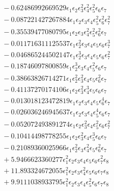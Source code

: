 \documentclass[10pt]{article}
\begin{document}
\begin{align*}
&{}  - 0.62486992669529 \epsilon_{1} \epsilon_{2} \epsilon_{3}^{2} \epsilon_{4}^{2} \epsilon_{5}^{2} \epsilon_{6} \epsilon_{7} \\
&{}  - 0.087221427267884 \epsilon_{1} \epsilon_{2} \epsilon_{3} \epsilon_{4} \epsilon_{5}^{2} \epsilon_{6}^{2} \epsilon_{7}^{2} \\
&{}  - 0.35539477080795 \epsilon_{1} \epsilon_{2} \epsilon_{3} \epsilon_{4}^{2} \epsilon_{5}^{2} \epsilon_{6}^{2} \epsilon_{7} \\
&{}  - 0.011716311125537 \epsilon_{1} \epsilon_{2}^{2} \epsilon_{3} \epsilon_{4} \epsilon_{5} \epsilon_{6} \epsilon_{7}^{3} \\
&{}  - 0.046865244502147 \epsilon_{1} \epsilon_{2}^{3} \epsilon_{3} \epsilon_{4} \epsilon_{5} \epsilon_{6} \epsilon_{7}^{2} \\
&{}  - 0.18746097800859 \epsilon_{1} \epsilon_{2}^{3} \epsilon_{3} \epsilon_{4} \epsilon_{5}^{2} \epsilon_{6} \epsilon_{7} \\
&{}  - 0.38663826714271 \epsilon_{1} \epsilon_{2}^{2} \epsilon_{3}^{2} \epsilon_{4} \epsilon_{5} \epsilon_{6}^{2} \epsilon_{7} \\
&{}  - 0.41137270174106 \epsilon_{1} \epsilon_{2} \epsilon_{3}^{2} \epsilon_{4}^{3} \epsilon_{5} \epsilon_{6} \epsilon_{7} \\
&{}  - 0.013018123472819 \epsilon_{1} \epsilon_{2} \epsilon_{3} \epsilon_{4} \epsilon_{5} \epsilon_{6}^{4} \epsilon_{7} \\
&{}  - 0.026036246945637 \epsilon_{1} \epsilon_{2} \epsilon_{3} \epsilon_{4} \epsilon_{5}^{4} \epsilon_{6} \epsilon_{7} \\
&{}  - 0.052072493891274 \epsilon_{1} \epsilon_{2} \epsilon_{3}^{2} \epsilon_{4} \epsilon_{5}^{2} \epsilon_{6} \epsilon_{7}^{2} \\
&{}  - 0.10414498778255 \epsilon_{1} \epsilon_{2} \epsilon_{3}^{2} \epsilon_{4} \epsilon_{5}^{3} \epsilon_{6} \epsilon_{7} \\
&{}  - 0.21089360025966 \epsilon_{1} \epsilon_{2}^{2} \epsilon_{3} \epsilon_{4}^{2} \epsilon_{5} \epsilon_{6}^{2} \epsilon_{7} \\
&{}  + 5.9466623360277 \epsilon_{1}^{2} \epsilon_{2} \epsilon_{3} \epsilon_{4} \epsilon_{5} \epsilon_{6} \epsilon_{7}^{2} \epsilon_{8} \\
&{}  + 11.893324672055 \epsilon_{1}^{2} \epsilon_{2} \epsilon_{3} \epsilon_{4}^{2} \epsilon_{5} \epsilon_{6} \epsilon_{7} \epsilon_{8} \\
&{}  + 9.9111038933795 \epsilon_{1}^{2} \epsilon_{2} \epsilon_{3} \epsilon_{4} \epsilon_{5}^{2} \epsilon_{6} \epsilon_{7} \epsilon_{8} \\

\end{align*}
\end{document}
